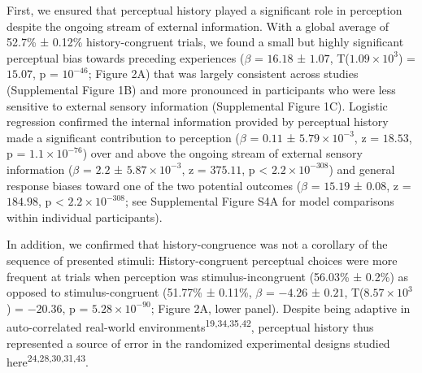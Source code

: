 \documentclass[
]{article}
\begin{document}
First, we ensured that perceptual history played a significant role in
perception despite the ongoing stream of external information. With a
global average of 52.7\% ± 0.12\% history-congruent trials, we found a
small but highly significant perceptual bias towards preceding
experiences (\(\beta\) = \(16.18\) ± \(1.07\),
T(\(\ensuremath{1.09\times 10^{3}}\)) = \(15.07\), p =
\(\ensuremath{10^{-46}}\); Figure 2A) that was largely consistent across
studies (Supplemental Figure 1B) and more pronounced in participants who
were less sensitive to external sensory information (Supplemental Figure
1C). Logistic regression confirmed the internal information provided by
perceptual history made a significant contribution to perception
(\(\beta\) = \(0.11\) ± \(\ensuremath{5.79\times 10^{-3}}\), z =
\(18.53\), p = \(\ensuremath{1.1\times 10^{-76}}\)) over and above the
ongoing stream of external sensory information (\(\beta\) = \(2.2\) ±
\(\ensuremath{5.87\times 10^{-3}}\), z = \(375.11\), p < \(\ensuremath{2.2\times 10^{-308}}\)) and
general response biases toward one of the two potential outcomes
(\(\beta\) = \(15.19\) ± \(0.08\), z = \(184.98\), p < \(\ensuremath{2.2\times 10^{-308}}\); see
Supplemental Figure S4A for model comparisons within individual
participants).

In addition, we confirmed that history-congruence was not a corollary of
the sequence of presented stimuli: History-congruent perceptual choices
were more frequent at trials when perception was stimulus-incongruent
(56.03\% ± 0.2\%) as opposed to stimulus-congruent (51.77\% ± 0.11\%,
\(\beta\) = \(-4.26\) ± \(0.21\), T(\(\ensuremath{8.57\times 10^{3}}\))
= \(-20.36\), p = \(\ensuremath{5.28\times 10^{-90}}\); Figure 2A, lower
panel). Despite being adaptive in auto-correlated real-world
environments\textsuperscript{19,34,35,42}, perceptual history thus
represented a source of error in the randomized experimental designs
studied here\textsuperscript{24,28,30,31,43}.
\end{document}
